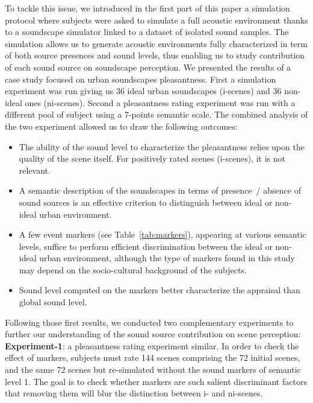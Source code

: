\documentclass[twoside,twocolumn]{article}
\begin{document}
To tackle this issue, we introduced in the first part of this paper \cite{lafayPartI} a simulation protocol where subjects were asked to simulate a full acoustic environment thanks to a soundscape simulator linked to a dataset of isolated sound samples. The simulation allows us to generate acoustic environments fully characterized in term of both source presences and sound levels, thus enabling us to study contribution of each sound source on soundscape perception. We presented the results of a case study focused on urban soundscapes pleasantness. First a simulation experiment was run giving us 36 ideal urban soundscapes (i-scenes) and 36 non-ideal ones (ni-scenes). Second a pleasantness rating experiment was run with a different pool of subject using a 7-points semantic scale. The combined analysis of the two experiment allowed us to draw the following outcomes:

\begin{itemize}
\item The ability of the sound level to characterize the pleasantness relies upon the quality of the scene itself. For positively rated scenes (i-scenes), it is not relevant.
\item  A semantic description of the soundscapes in terms of presence~/ absence of sound sources is an effective criterion to distinguish between ideal or non-ideal urban environment.
\item  A few event markers (see Table~\ref{tab:markers}), appearing at various semantic levels, suffice to perform efficient discrimination between the ideal or non-ideal urban environment, although the type of markers found in this study may depend on the socio-cultural background of the subjects. 
\item Sound level computed on the markers better characterize the appraisal than global sound level.
\end{itemize}

Following those first results, we conducted two complementary experiments to further our understanding of the sound source contribution on scene perception:\\

\textbf{Experiment-1}: a pleasantness rating experiment similar. In order to check the effect of markers, subjects must rate 144 scenes comprising the 72 initial scenes, and the same 72 scenes but re-simulated without the sound markers of semantic level 1. The goal is to check whether markers are such salient discriminant factors that removing them will blur the distinction between i- and ni-scenes.\\
\end{document}
